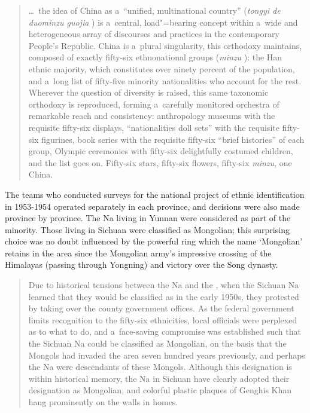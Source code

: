 \begin{quotation}
	{\dots}~the idea of China as a~“unified, multinational country” (\textit{tongyi de duominzu guojia} ) is a~central, load"=bearing concept within a~wide and heterogeneous array of discourses and practices in the contemporary People's Republic. China is a~plural singularity, this orthodoxy maintains, composed of exactly fifty-six ethnonational groups (\textit{minzu} ): the Han ethnic majority, which constitutes over ninety percent of the population, and a~long list of fifty-five minority nationalities who account for the rest. Wherever the {question} of diversity is raised, this same taxonomic orthodoxy is reproduced, forming a~carefully monitored orchestra of remarkable reach and consistency: anthropology museums with the requisite fifty-six displays, “nationalities doll sets” with the requisite fifty-six figurines, book series with the requisite fifty-six “brief histories” of each group, Olympic ceremonies with fifty-six delightfully costumed children, and the list goes on. Fifty-six stars, fifty-six flowers, fifty-six \textit{minzu}, one China. \citep[1]{mullaney2010}
\end{quotation}

The teams who conducted surveys for the national project of ethnic identification in 1953-1954 operated separately in each province, and decisions were also made province by province. The Na living in Yunnan were considered as part of the  minority. Those living in Sichuan were classified as Mongolian; this surprising choice was no doubt influenced by the powerful ring which the name ‘Mongolian’ retains in the area since the Mongolian army’s impressive crossing of the Himalayas (passing through Yongning) and victory over the Song dynasty.

\begin{quotation}
	Due to historical tensions between the Na and the , when the Sichuan Na learned that they
	would be classified as  in the early 1950s, they protested by taking over the county
	government offices. As the federal government limits recognition to the fifty-six
	ethnicities, local officials were perplexed as to what to do, and a~face-saving compromise
	was established such that the Sichuan Na could be classified as Mongolian, on the basis
	that the Mongols had invaded the area seven hundred years previously, and perhaps the
	Na were descendants of these Mongols. Although this designation is within historical
	memory, the Na in Sichuan have clearly adopted their designation as Mongolian, and
	colorful plastic plaques of Genghis Khan hang prominently on the walls in homes.
	\citep[9]{lidz2010}
\end{quotation}

